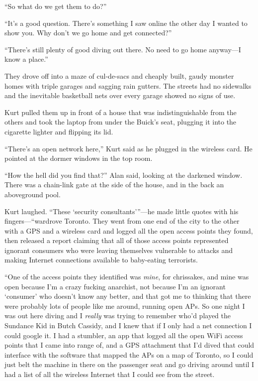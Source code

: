\documentclass{article}
\begin{document}
``So what do we get them to do?''

``It's a good question.  There's something I saw online the other day
I wanted to show you.  Why don't we go home and get connected?''

``There's still plenty of good diving out there.  No need to go home
anyway---I know a place.''

They drove off into a maze of cul-de-sacs and cheaply built, gaudy
monster homes with triple garages and sagging rain gutters.  The
streets had no sidewalks and the inevitable basketball nets over every
garage showed no signs of use.

Kurt pulled them up in front of a house that was indistinguishable
from the others and took the laptop from under the Buick's seat,
plugging it into the cigarette lighter and flipping its lid.

``There's an open network here,'' Kurt said as he plugged in the
wireless card.  He pointed at the dormer windows in the top room.

``How the hell did you find that?'' Alan said, looking at the darkened
window.  There was a chain-link gate at the side of the house, and in
the back an aboveground pool.

Kurt laughed.  ``These `security consultants'''---he made little quotes
with his fingers---``wardrove Toronto.  They went from one end of the
city to the other with a GPS and a wireless card and logged all the
open access points they found, then released a report claiming that
all of those access points represented ignorant consumers who were
leaving themselves vulnerable to attacks and making Internet
connections available to baby-eating terrorists.

``One of the access points they identified was \textit{mine}, for
chrissakes, and mine was open because I'm a crazy fucking anarchist,
not because I'm an ignorant `consumer' who doesn't know any better,
and that got me to thinking that there were probably lots of people
like me around, running open APs.  So one night I was out here diving
and I \textit{really} was trying to remember who'd played the Sundance
Kid in Butch Cassidy, and I knew that if I only had a net connection I
could google it.  I had a stumbler, an app that logged all the open
WiFi access points that I came into range of, and a GPS attachment
that I'd dived that could interface with the software that mapped the
APs on a map of Toronto, so I could just belt the machine in there on
the passenger seat and go driving around until I had a list of all the
wireless Internet that I could see from the street.
\end{document}

